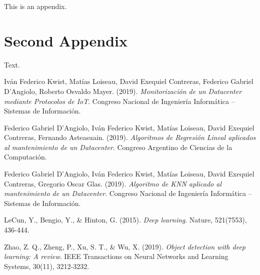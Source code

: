 \documentclass{article} %
\begin{document}
This is an appendix.

\cleardoublepage

\section{Second Appendix}\label{app:two}

Text.

\cleardoublepage

\begin{thebibliography}{9}

Iván Federico Kwist, Matías Loiseau, David Exequiel Contreras, Federico Gabriel D’Angiolo, Roberto Osvaldo Mayer. (2019). \textit{Monitorización de un Datacenter mediante Protocolos de IoT}. Congreso Nacional de Ingeniería Informática – Sistemas de Información.

Federico Gabriel D’Angiolo, Iván Federico Kwist, Matías Loiseau, David Exequiel Contreras, Fernando Asteasuain. (2019). \textit{Algoritmos de Regresión Lineal aplicados al mantenimiento de un Datacenter}. Congreso Argentino de Ciencias de la Computación.

Federico Gabriel D’Angiolo, Iván Federico Kwist, Matías Loiseau, David Exequiel Contreras, Gregorio Oscar Glas. (2019). \textit{Algoritmo de KNN aplicado al mantenimiento de un Datacenter}. Congreso Nacional de Ingeniería Informática – Sistemas de Información.

LeCun, Y., Bengio, Y., \& Hinton, G. (2015). \textit{Deep learning}. Nature, 521(7553), 436-444.

Zhao, Z. Q., Zheng, P., Xu, S. T., \& Wu, X. (2019). \textit{Object detection with deep learning: A review}. IEEE Transactions on Neural Networks and Learning Systems, 30(11), 3212-3232.

\end{thebibliography}
\end{document}
